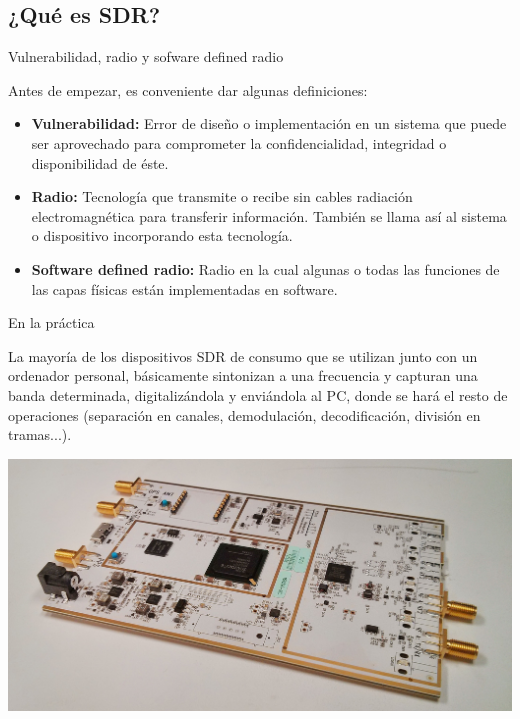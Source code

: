 \documentclass{beamer}
\begin{document}
\subsection{¿Qué es SDR?}

\begin{frame}{Vulnerabilidad, radio y sofware defined radio}

Antes de empezar, es conveniente dar algunas definiciones:

\begin{itemize}
	\item \textbf{Vulnerabilidad: } Error de diseño o implementación en un sistema que puede ser aprovechado para comprometer la confidencialidad, integridad o disponibilidad de éste.
	\item \textbf{Radio:} Tecnología que transmite o recibe sin cables radiación electromagnética para transferir información. También se llama así al sistema o dispositivo incorporando esta tecnología.
	\item \textbf{Software defined radio:} Radio en la cual algunas o todas las funciones de las capas físicas están implementadas en software.
\end{itemize}

\end{frame}

\begin{frame}{En la práctica}

La mayoría de los dispositivos SDR de consumo que se utilizan junto con un ordenador personal, básicamente sintonizan a una frecuencia y capturan una banda determinada, digitalizándola y enviándola al PC, donde se hará el resto de operaciones (separación en canales, demodulación, decodificación, división en tramas...).

\begin{center}
\includegraphics[scale=0.06]{USRP-B200.jpg}
\end{center}

\end{frame}
\end{document}
